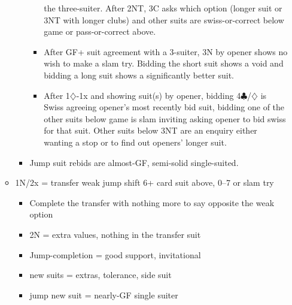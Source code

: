 \documentclass[a4paper,14pt]{extarticle}
\begin{document}
\begin{itemize}
\begin{itemize}
\begin{itemize}
\begin{itemize}
				the three-suiter. After 2NT, 3C asks which option (longer suit or 3NT with longer clubs)
				and other suits are swiss-or-correct below game or pass-or-correct above.
			\item After GF+ suit agreement with a 3-suiter, 3N by opener shows no wish to make
				a slam try. Bidding the short suit shows a void and bidding a long suit shows
				a significantly better suit.
			\item After 1$\diamondsuit$-1x and showing suit(s) by opener, bidding 4$\clubsuit$/$\diamondsuit$
				is Swiss  agreeing opener's most recently bid suit, bidding one of the other suits below 
				game is slam inviting asking opener to bid swiss for that suit. Other suits below 3NT are an enquiry
				either wanting a stop or to find out openers' longer suit.
			\end{itemize}
      \item Jump suit rebids are almost-GF, semi-solid single-suited.
		\end{itemize}
   \item 1N/2x = transfer weak jump shift 6+ card suit above, 0--7 or slam try
		\begin{itemize}
		\item Complete the transfer with nothing more to say opposite the weak option
		\item 2N = extra values, nothing in the transfer suit
		\item Jump-completion = good support, invitational
		\item new suits = extras, tolerance, side suit
		\item jump new suit = nearly-GF single suiter
		\end{itemize}
	\end{itemize}


\end{itemize}
\end{document}
